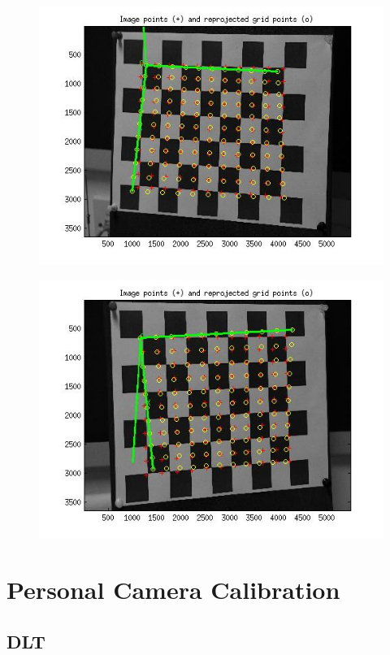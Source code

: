 \documentclass[12pt]{article}
\begin{document}
\begin{figure}[htp]
\centering
\includegraphics[width=1\textwidth]{wireFrame5457.jpg}\hfill
\end{figure}

\begin{figure}[htp]
\centering
\includegraphics[width=1\textwidth]{wireFrame5458_2.jpg}\hfill
\end{figure}

\clearpage


\section{Personal Camera Calibration}
\subsection{DLT}
\end{document}
